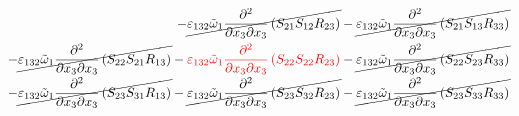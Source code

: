 \begin{equation}
\begin{split}
		-\cancel{\varepsilon_{132}\tilde{\omega}_{1}\pdv{}{x_{3}}{x_{3}}\left(S_{21}S_{12}R_{23}\right)}
		-\cancel{\varepsilon_{132}\tilde{\omega}_{1}\pdv{}{x_{3}}{x_{3}}\left(S_{21}S_{13}R_{33}\right)}\\
		-\cancel{\varepsilon_{132}\tilde{\omega}_{1}\pdv{}{x_{3}}{x_{3}}\left(S_{22}S_{21}R_{13}\right)}
		-{\color{red}\varepsilon_{132}\tilde{\omega}_{1}\pdv{}{x_{3}}{x_{3}}\left(S_{22}S_{22}R_{23}\right)}
		-\cancel{\varepsilon_{132}\tilde{\omega}_{1}\pdv{}{x_{3}}{x_{3}}\left(S_{22}S_{23}R_{33}\right)}\\
		-\cancel{\varepsilon_{132}\tilde{\omega}_{1}\pdv{}{x_{3}}{x_{3}}\left(S_{23}S_{31}R_{13}\right)}
		-\cancel{\varepsilon_{132}\tilde{\omega}_{1}\pdv{}{x_{3}}{x_{3}}\left(S_{23}S_{32}R_{23}\right)}
		-\cancel{\varepsilon_{132}\tilde{\omega}_{1}\pdv{}{x_{3}}{x_{3}}\left(S_{23}S_{33}R_{33}\right)}\\
	\end{split}
\end{equation}
